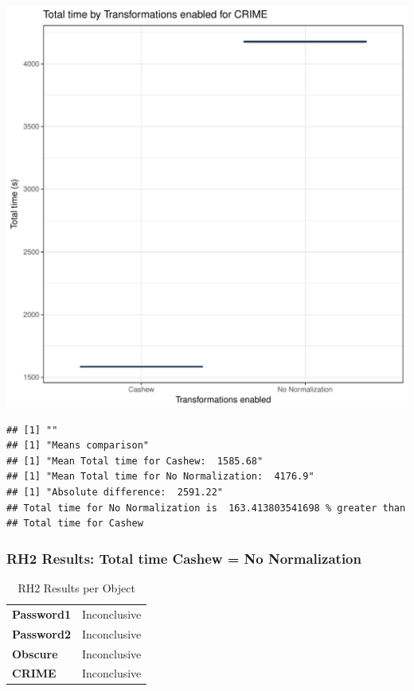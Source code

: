 \documentclass{article}\usepackage[]{graphicx}\usepackage[]{color}
\makeatletter
\def\maxwidth{ %
  \ifdim\Gin@nat@width>\linewidth
    \linewidth
  \else
    \Gin@nat@width
  \fi
}
\newenvironment{kframe}{%
 \def\at@end@of@kframe{}%
 \ifinner\ifhmode%
  \def\at@end@of@kframe{\end{minipage}}%
  \begin{minipage}{\columnwidth}%
 \fi\fi%
 \def\FrameCommand##1{\hskip\@totalleftmargin \hskip-\fboxsep
 \colorbox{shadecolor}{##1}\hskip-\fboxsep
     \hskip-\linewidth \hskip-\@totalleftmargin \hskip\columnwidth}%
 \MakeFramed {\advance\hsize-\width
   \@totalleftmargin\z@ \linewidth\hsize
   \@setminipage}}%
 {\par\unskip\endMakeFramed%
 \at@end@of@kframe}
\newenvironment{knitrout}{}{} %
\makeatother
\begin{document}
\begin{knitrout}
\color{fgcolor}
\includegraphics[width=\maxwidth]{figure/RH2_crime-1} 
\begin{kframe}

{\ttfamily\noindent\bfseries\color{errorcolor}{\#\# Error in eval(expr, envir, enclos): object 'shap\_cashew\_crime' not found}}\begin{verbatim}
## [1] ""
## [1] "Means comparison"
## [1] "Mean Total time for Cashew:  1585.68"
## [1] "Mean Total time for No Normalization:  4176.9"
## [1] "Absolute difference:  2591.22"
## Total time for No Normalization is  163.413803541698 % greater than 
## Total time for Cashew
\end{verbatim}
\end{kframe}
\end{knitrout}


 

	
	\subsubsection{RH2 Results: Total time Cashew = No Normalization}
	
	
	\begin{table}[H]
	\centering
	\caption{RH2 Results per Object}
	\begin{tabular}{ll}
	\textbf{Password1} & Inconclusive \\
	\textbf{Password2} & Inconclusive \\
	\textbf{Obscure} & Inconclusive \\
	\textbf{CRIME} & Inconclusive \\
	\end{tabular}
	\end{table}
\end{document}
